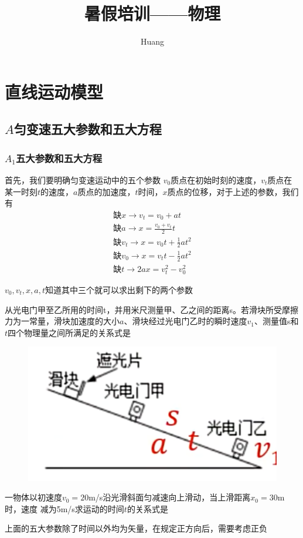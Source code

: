\documentclass[lang=cn,10pt]{elegantbook}
\title{暑假培训——物理}
\author{ Huang}
\begin{document}
	
	\maketitle
	\frontmatter
	
	\tableofcontents
	
	\mainmatter
	\chapter{直线运动模型}
	\section{$A$匀变速五大参数和五大方程}
	\subsection{$A_{1}$五大参数和五大方程}
	首先，我们要明确匀变速运动中的五个参数
	$v_{0}$质点在初始时刻的速度，$v_{t}$质点在某一时刻$t$的速度，$a$质点的加速度，$t$时间，$x$质点的位移，对于上述的参数，我们有
	\begin{equation*}
		\begin{split}
		\text{缺}x\longrightarrow v_t=v_0+at
		\\
		\text{缺}a\longrightarrow x=\frac{v_0+v_t}{2}t
		\\
		\text{缺}v_t\longrightarrow x=v_0t+\frac{1}{2}at^2
		\\
		\text{缺}v_0\longrightarrow x=v_tt-\frac{1}{2}at^2
		\\
		\text{缺}t\longrightarrow 2ax=v_{t}^{2}-v_{0}^{2}
		\end{split}
	\end{equation*}
	\begin{remark}
		$v_{0},v_{t},x,a,t $知道其中三个就可以求出剩下的两个参数
	\end{remark}
	\begin{example}
		从光电门甲至乙所用的时间t，并用米尺测量甲、乙之间的距离s。若滑块所受摩擦力为一常量，滑块加速度的大小$a$、滑块经过光电门乙时的瞬时速度$v_1$、测量值s和$t$四个物理量之间所满足的关系式是
		\begin{figure}[H]
			\centering
			\includegraphics[width=0.35\linewidth]{image/1}
			\label{fig:1}
		\end{figure}
	\end{example}
	\vspace{1.3cm}
	\begin{example}
		一物体以初速度$v_0=20$m/s沿光滑斜面匀减速向上滑动，当上滑距离$x_0=30$m时，速度
		减为5m/s求运动的时间$t$的关系式是
	\end{example}
	\vspace{2cm}
	\begin{remark}
		上面的五大参数除了时间以外均为矢量，在规定正方向后，需要考虑正负
	\end{remark}
\end{document}
